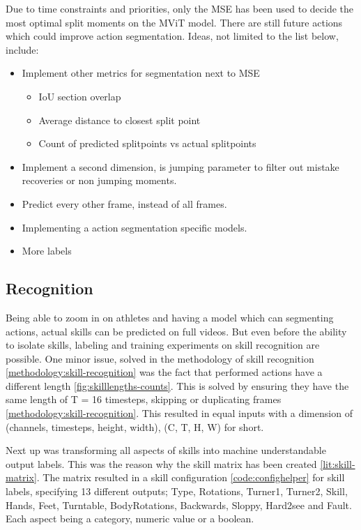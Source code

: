Due to time constraints and priorities, only the MSE has been used to decide the most optimal split moments on the MViT model. There are still future actions which could improve action segmentation. Ideas, not limited to the list below, include:

\begin{itemize}
    \item Implement other metrics for segmentation next to MSE
        \begin{itemize}
            \item IoU section overlap
            \item Average distance to closest split point
            \item Count of predicted splitpoints vs actual splitpoints
        \end{itemize}
    \item Implement a second dimension, is jumping parameter to filter out mistake recoveries or non jumping moments.
    \item Predict every other frame, instead of all frames.
    \item Implementing a action segmentation specific models.
    \item More labels
\end{itemize}

\subsection{Recognition}

Being able to zoom in on athletes and having a model which can segmenting actions, actual skills can be predicted on full videos.
But even before the ability to isolate skills, labeling and training experiments on skill recognition are possible. One minor issue, solved in the methodology of skill recognition \ref{methodology:skill-recognition} was the fact that performed actions have a different length \ref{fig:skilllengths-counts}. This is solved by ensuring they have the same length of T = 16 timesteps, skipping or duplicating frames \ref{methodology:skill-recognition}. This resulted in equal inputs with a dimension of (channels, timesteps, height, width), (C, T, H, W) for short.

Next up was transforming all aspects of skills into machine understandable output labels. This was the reason why the skill matrix has been created \ref{lit:skill-matrix}. The matrix resulted in a skill configuration \ref{code:confighelper} for skill labels, specifying 13 different outputs; Type, Rotations, Turner1, Turner2, Skill, Hands, Feet, Turntable, BodyRotations, Backwards, Sloppy, Hard2see and Fault. Each aspect being a category, numeric value or a boolean.

